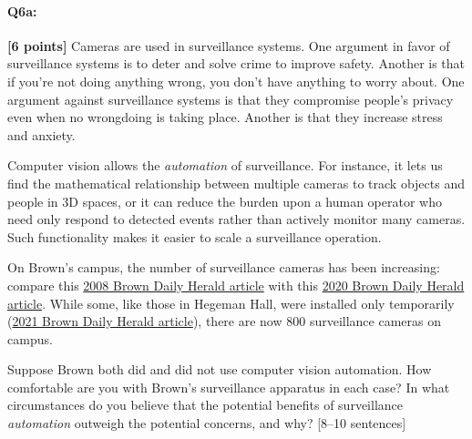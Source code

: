 \documentclass{csci1430}
\begin{document}
\pagebreak 
\paragraph{Q6a:} \textbf{[6 points]} Cameras are used in surveillance systems. One argument in favor of surveillance systems is to deter and solve crime to improve safety. Another is that if you're not doing anything wrong, you don't have anything to worry about. One argument against surveillance systems is that they compromise people's privacy even when no wrongdoing is taking place. Another is that they increase stress and anxiety.

Computer vision allows the \emph{automation} of surveillance. For instance, it lets us find the mathematical relationship between multiple cameras to track objects and people in 3D spaces, or it can reduce the burden upon a human operator who need only respond to detected events rather than actively monitor many cameras. Such functionality makes it easier to scale a surveillance operation.

On Brown's campus, the number of surveillance cameras has been increasing: compare this \href{https://www.browndailyherald.com/2008/01/10/surveillance-cameras-on-campus-triple/}{2008 Brown Daily Herald article} with this \href{https://www.browndailyherald.com/2020/02/21/cameras-installed-hegeman-hall/}{2020 Brown Daily Herald article}. While some, like those in Hegeman Hall, were installed only temporarily (\href{https://www.browndailyherald.com/article/2021/07/university-removes-hegeman-hall-surveillance-cameras}{2021 Brown Daily Herald article}), there are now 800 surveillance cameras on campus.

\begin{tcolorbox}[colback=orange!5!white,colframe=orange!75!black]
Suppose Brown both did and did not use computer vision automation. How comfortable are you with Brown's surveillance apparatus in each case?
In what circumstances do you believe that the potential benefits of surveillance \emph{automation} outweigh the potential concerns, and why? [8--10 sentences]
\end{tcolorbox}
\end{document}

